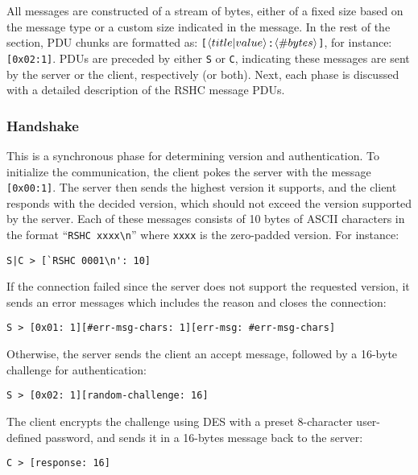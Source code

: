 All messages are constructed of a stream of bytes, either of a fixed size based on the message type or a custom size indicated in the message. In the rest of the section, PDU chunks are formatted as: {\tt [$\left \langle title | value \right \rangle $:$\left \langle \#bytes \right \rangle $]}, for instance: {\tt [0x02:1]}. PDUs are preceded by either {\tt S} or {\tt C}, indicating these messages are sent by the server or the client, respectively (or both).
Next, each phase is discussed with a detailed description of the RSHC message PDUs.

\subsubsection{Handshake}
\label{sec:pdus:pdu:hs}

This is a synchronous phase for determining version and authentication. To initialize the communication, the client pokes the server with the message {\tt [0x00:1]}. The server then sends the highest version it supports, and the client responds with the decided version, which should not exceed the version supported by the server. Each of these messages consists of 10 bytes of ASCII characters in the format ``{\tt RSHC xxxx\textbackslash n}'' where {\tt xxxx} is the zero-padded version. For instance:

\begin{verbatim}
S|C > [`RSHC 0001\n': 10]
\end{verbatim}

\noindent
If the connection failed since the server does not support the requested version, it sends an error messages which includes the reason and closes the connection:

\begin{verbatim}
S > [0x01: 1][#err-msg-chars: 1][err-msg: #err-msg-chars]
\end{verbatim}

\noindent
Otherwise, the server sends the client an accept message, followed by a 16-byte challenge for authentication:

\begin{verbatim}
S > [0x02: 1][random-challenge: 16]
\end{verbatim}

\noindent
The client encrypts the challenge using DES with a preset 8-character user-defined password, and sends it in a 16-bytes message back to the server:

\begin{verbatim}
C > [response: 16]
\end{verbatim}

